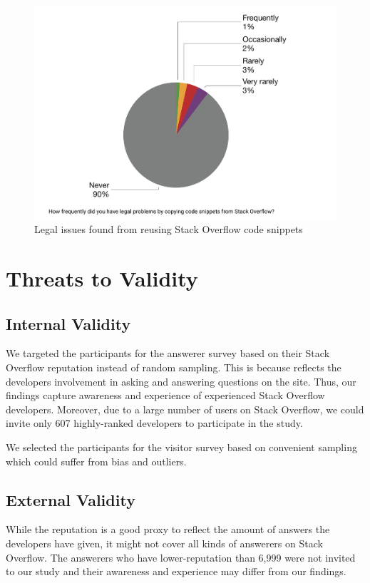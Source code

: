 \documentclass{svjour3}                     %
\begin{document}
\begin{figure} \centering
	\includegraphics[width=.4\linewidth]{survey_visitor_legal_issue} 
	\caption{Legal issues found from reusing Stack Overflow code snippets}
	\label{fig:survey_visitor_legal_issue} 
\end{figure}

\vspace{0.5cm} \noindent{} \vspace{0.5cm}

\section{Threats to Validity}

\subsection{Internal Validity}
We targeted the participants for the answerer survey based on their Stack Overflow
reputation instead of random sampling. This is because reflects the developers
involvement in asking and answering questions on the site. Thus, our findings
capture awareness and experience of experienced Stack Overflow developers. Moreover,
due to a large number of users on Stack Overflow, we could invite only 607
highly-ranked developers to participate in the study.

We selected the participants for the visitor survey based on convenient sampling which
could suffer from bias and outliers.

\subsection{External Validity} 
While the reputation is a good proxy to reflect the amount of answers the
developers have given, it might not cover all kinds of answerers on Stack
Overflow. The answerers who have lower-reputation than 6,999 were not invited to
our study and their awareness and experience may differ from our findings.
\end{document}
